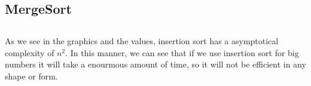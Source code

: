 \documentclass[a4paper,12pt]{article}
\begin{document}
    \subsection{MergeSort}
    \begin{figure}[H]
      \begin{floatrow}
      \end{floatrow}
    \end{figure}

    \subsection{}
    As we see in the graphics and the values, insertion sort has a asymptotical
complexity of $n^2$. In this manner, we can see that if we use insertion sort for
big numbers it will take a enourmous amount of time, so it will not be
efficient in any shape or form.
\end{document}
